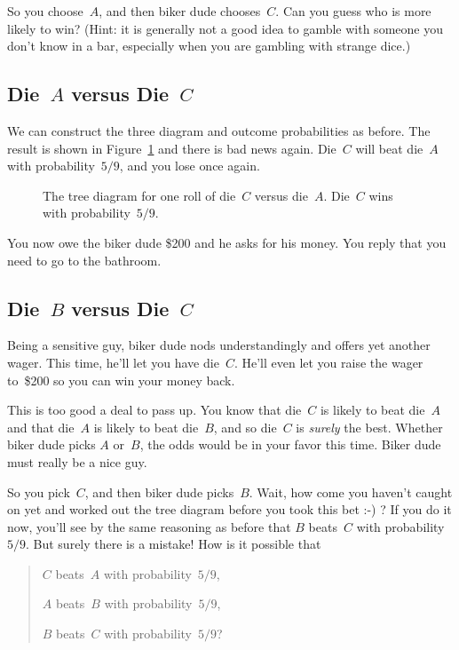 So you choose~$A$, and then biker dude chooses~$C$.  Can you guess who
is more likely to win?  (Hint: it is generally not a good idea to
gamble with someone you don't know in a bar, especially when you are
gambling with strange dice.)

\subsection{Die~$A$ versus Die~$C$}

We can construct the three diagram and outcome probabilities as
before.  The result is shown in Figure~\ref{fig:14A9} and there is bad
news again.  Die~$C$ will beat die~$A$ with probability~$5/9$, and you
lose once again.

\begin{figure}


\caption{The tree diagram for one roll of die~$C$ versus die~$A$.
  Die~$C$ wins with probability~$5/9$.}

\label{fig:14A9}

\end{figure}

You now owe the biker dude \$200 and he asks for his money.  You reply
that you need to go to the bathroom.

\subsection{Die~$B$ versus Die~$C$}

Being a sensitive guy, biker dude nods understandingly and offers yet
another wager.  This time, he'll let you have die~$C$.  He'll even let
you raise the wager to~\$200 so you can win your money back.

This is too good a deal to pass up.  You know that die~$C$ is likely
to beat die~$A$ and that die~$A$ is likely to beat die~$B$, and so
die~$C$ is \emph{surely} the best.  Whether biker dude picks $A$
or~$B$, the odds would be in your favor this time.  Biker dude must
really be a nice guy.

So you pick~$C$, and then biker dude picks~$B$.  Wait, how come you
haven't caught on yet and worked out the tree diagram before you took
this bet :-) ?  If you do it now, you'll see by the same reasoning as
before that $B$ beats~$C$ with probability~$5/9$.  But surely there is
a mistake!  How is it possible that
\begin{quote}

$C$ beats~$A$ with probability~$5/9$,

$A$ beats~$B$ with probability~$5/9$,

$B$ beats~$C$ with probability~$5/9$?
\end{quote}


